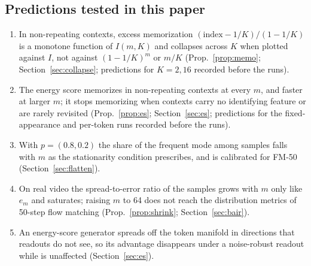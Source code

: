 \subsection{Predictions tested in this paper}
\label{sec:predictions}
\begin{enumerate}
\item[P1] In non-repeating contexts, excess memorization $(\text{index} - 1/K)/(1 - 1/K)$ is a monotone function of $I(m,K)$ and collapses across $K$ when plotted against $I$, not against $(1-1/K)^m$ or $m/K$ (Prop.~\ref{prop:memo}; Section~\ref{sec:collapse}; predictions for $K{=}2,16$ recorded before the runs).
\item[P2] The energy score memorizes in non-repeating contexts at every $m$, and faster at larger $m$; it stops memorizing when contexts carry no identifying feature or are rarely revisited (Prop.~\ref{prop:es}; Section~\ref{sec:es}; predictions for the fixed-appearance and per-token runs recorded before the runs).
\item[P3] With $p = (0.8, 0.2)$ the share of the frequent mode among \nom{} samples falls with $m$ as the stationarity condition prescribes, and is calibrated for FM-50 (Section~\ref{sec:flatten}).
\item[P4] On real video the spread-to-error ratio of the samples grows with $m$ only like $e_m$ and saturates; raising $m$ to 64 does not reach the distribution metrics of 50-step flow matching (Prop.~\ref{prop:shrink}; Section~\ref{sec:bair}).
\item[P5] An energy-score generator spreads off the token manifold in directions that readouts do not see, so its advantage disappears under a noise-robust readout while \nom{} is unaffected (Section~\ref{sec:es}).
\end{enumerate}
